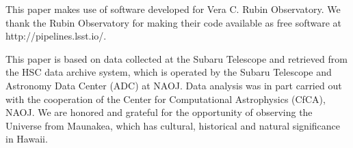 \documentclass[longauth]{aa}
\begin{document}
\begin{acknowledgements}
This paper makes use of software developed for Vera C. Rubin Observatory. We thank the Rubin Observatory for making their code available as free software at http://pipelines.lsst.io/.

This paper is based on data collected at the Subaru Telescope and retrieved from the HSC data archive system, which is operated by the Subaru Telescope and Astronomy Data Center (ADC) at NAOJ. Data analysis was in part carried out with the cooperation of the Center for Computational Astrophysics (CfCA), NAOJ. We are honored and grateful for the opportunity of observing the Universe from Maunakea, which has cultural, historical and natural significance in Hawaii.

\end{acknowledgements}


\vspace{5mm}



\end{document}
